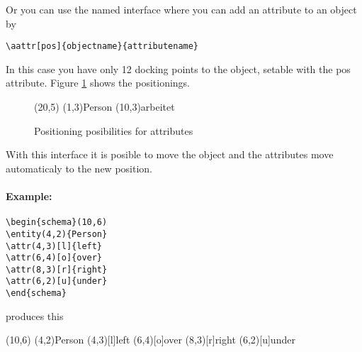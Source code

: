 \documentclass[a4paper,11pt]{article}
\begin{document}
Or you can use the named interface where you can add an attribute to an object by

\begin{verbatim}
\aattr[pos]{objectname}{attributename}
\end{verbatim}

In this case you have only 12 docking points to the object, setable with the pos attribute.
Figure \ref{fig:attr_pos} shows the positionings.

\begin{figure}[htb]
  \centering
  \begin{schema}(20,5)
  \entity(1,3){Person}
  \relation(10,3){arbeitet}
\end{schema}

  \caption{Positioning posibilities for attributes}
  \label{fig:attr_pos}
\end{figure}

With this interface it is posible to move the object and the attributes
move automaticaly to the new position.

\paragraph{Example:}

\begin{verbatim}
\begin{schema}(10,6)
\entity(4,2){Person}
\attr(4,3)[l]{left}
\attr(6,4)[o]{over}
\attr(8,3)[r]{right}
\attr(6,2)[u]{under}
\end{schema}
\end{verbatim}

produces this

\begin{schema}(10,6)
\entity(4,2){Person}
\attr(4,3)[l]{left}
\attr(6,4)[o]{over}
\attr(8,3)[r]{right}
\attr(6,2)[u]{under}
\end{schema}
\end{document}
